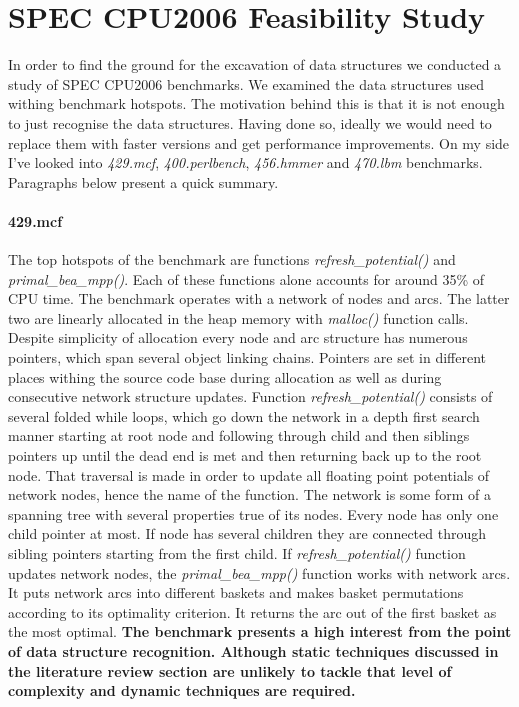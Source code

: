 \documentclass[10pt,a4paper]{report}
\begin{document}
\section{SPEC CPU2006 Feasibility Study}
\quad In order to find the ground for the excavation of data structures we conducted a study of SPEC CPU2006 benchmarks. We examined the data structures used withing benchmark hotspots. The motivation behind this is that it is not enough to just recognise the data structures. Having done so, ideally we would need to replace them with faster versions and get performance improvements. On my side I've looked into \textit{429.mcf}, \textit{400.perlbench}, \textit{456.hmmer} and \textit{470.lbm} benchmarks. Paragraphs below present a quick summary.

\paragraph{429.mcf} The top hotspots of the benchmark are functions \textit{refresh\_potential()} and \textit{primal\_bea\_mpp()}. Each of these functions alone accounts for around 35\% of CPU time. The benchmark operates with a network of nodes and arcs. The latter two are linearly allocated in the heap memory with \textit{malloc()} function calls. Despite simplicity of allocation every node and arc structure has numerous pointers, which span several object linking chains. Pointers are set in different places withing the source code base during allocation as well as during consecutive network structure updates. Function \textit{refresh\_potential()} consists of several folded while loops, which go down the network in a depth first search manner starting at root node and following through child and then siblings pointers up until the dead end is met and then returning back up to the root node. That traversal is made in order to update all floating point potentials of network nodes, hence the name of the function. The network is some form of a spanning tree with several properties true of its nodes. Every node has only one child pointer at most. If node has several children they are connected through sibling pointers starting from the first child. If \textit{refresh\_potential()} function updates network nodes, the \textit{primal\_bea\_mpp()} function works with network arcs. It puts network arcs into different baskets and makes basket permutations according to its optimality criterion. It returns the arc out of the first basket as the most optimal.\newline\null
\quad\textbf{The benchmark presents a high interest from the point of data structure recognition. Although static techniques discussed in the literature review section are unlikely to tackle that level of complexity and dynamic techniques are required.}
\end{document}
